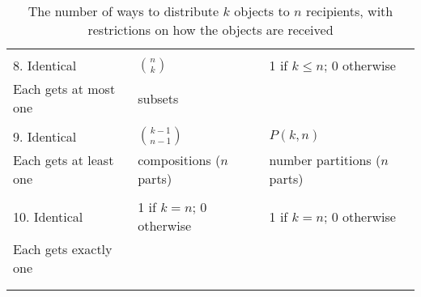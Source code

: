 \documentclass[10pt,]{book}
\theoremstyle{plain}
\theoremstyle{definition}
\numberwithin{equation}{chapter}
\newcommand{\hrulethin}  {\noalign{\hrule height 0.04em}}
\begin{document}
\begin{table}
\begin{tabular}{lll}
&&\tabularnewline\hrulethin
8.  Identical&\(n\choose k\)&1 if \(k\le n\); 0 otherwise\tabularnewline[0pt]
Each gets at most one&subsets&\tabularnewline[0pt]
&&\tabularnewline\hrulethin
9.  Identical&\(k-1\choose n-1\)&\(P(k,n)\)\tabularnewline[0pt]
Each gets at least one&compositions (\(n\) parts)&number partitions (\(n\) parts)\tabularnewline[0pt]
&&\tabularnewline\hrulethin
10.  Identical&1 if \(k=n\); 0 otherwise&1 if \(k=n\); 0 otherwise\tabularnewline[0pt]
Each gets exactly one&&\tabularnewline[0pt]
&&\tabularnewline\hrulethin
\end{tabular}
\caption{The number of ways to distribute \(k\) objects to \(n\) recipients, with restrictions on how the objects are received\label{lastdistributiontable}}
\end{table}
\typeout{************************************************}
\typeout{************************************************}
\end{document}
